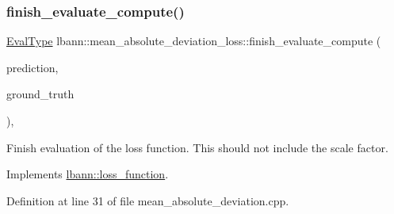 \mbox{\label{classlbann_1_1mean__absolute__deviation__loss_ab0a19f6393ef5df9275f1ed4802e8cf6}} 
\subsubsection{\texorpdfstring{finish\+\_\+evaluate\+\_\+compute()}{finish\_evaluate\_compute()}}
{\footnotesize\ttfamily \hyperlink{base_8hpp_a3266f5ac18504bbadea983c109566867}{Eval\+Type} lbann\+::mean\+\_\+absolute\+\_\+deviation\+\_\+loss\+::finish\+\_\+evaluate\+\_\+compute (\begin{DoxyParamCaption}\item[{const \hyperlink{base_8hpp_a9a697a504ae84010e7439ffec862b470}{Abs\+Dist\+Mat} \&}]{prediction,  }\item[{const \hyperlink{base_8hpp_a9a697a504ae84010e7439ffec862b470}{Abs\+Dist\+Mat} \&}]{ground\+\_\+truth }\end{DoxyParamCaption})\hspace{0.3cm}{\ttfamily [override]}, {\ttfamily [virtual]}}

Finish evaluation of the loss function. This should not include the scale factor. 

Implements \hyperlink{classlbann_1_1loss__function_a3ea8553a4e9c75477d7d4fc533c4d4fd}{lbann\+::loss\+\_\+function}.



Definition at line 31 of file mean\+\_\+absolute\+\_\+deviation.\+cpp.


